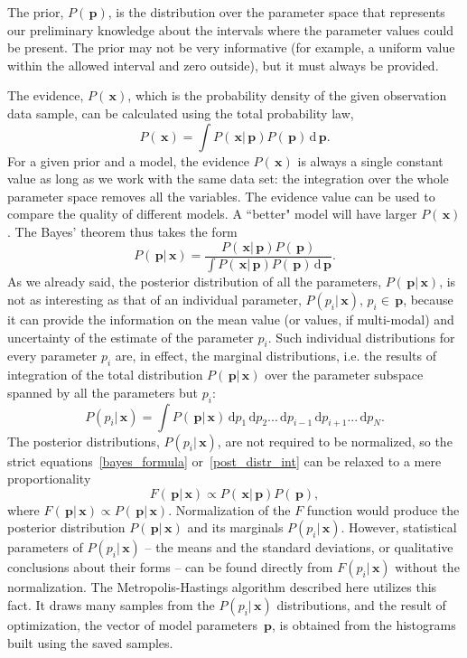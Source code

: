 \documentclass[preprint2]{aastex}
\newcommand{\bfp}{\,\mathbf{p}}
\newcommand{\bfx}{\,\mathbf{x}}
\newcommand{\ud}{\,\mathrm{d}}
\begin{document}
The prior, $P(\bfp)$, is the distribution over the parameter space that represents our preliminary knowledge about the intervals where the parameter values could be present.
The prior may not be very informative (for example, a uniform value within the allowed interval and zero outside), but it must always be provided.  

The evidence, $P(\bfx)$, which is the probability density of the given observation data sample, can be calculated using the total probability law,
\begin{equation}
  P(\bfx) = \int P(\bfx|\bfp)P(\bfp) \ud \bfp.
\end{equation}
For a given prior and a model, the evidence $P(\bfx)$ is always a single constant value as long as we work with the same data set: the integration over the whole parameter space removes all the variables. The evidence value can be used to compare the quality of different models. A ``better" model will have larger $P(\bfx)$. The Bayes' theorem thus takes the form
\begin{equation}
  \label{post_distr_int}
  P(\bfp|\bfx) =  \frac{P(\bfx|\bfp)P(\bfp)}{\int P(\bfx|\bfp)P(\bfp) \ud \bfp}.
\end{equation}
As we already said, the posterior distribution of all the parameters, $P(\bfp|\bfx)$, is not as interesting as that of an individual parameter, $P(p_i|\bfx)$, $p_i \in \bfp$, because it can provide the information on the mean value (or values, if multi-modal) and uncertainty of the estimate of the parameter $p_i$. Such individual distributions for every parameter $p_i$ are, in effect, the marginal distributions, i.e. the results of integration of the total distribution $P(\bfp|\bfx)$ over the parameter subspace spanned by all the parameters but $p_i$:
\begin{equation}
  \label{param_post_distr}
  P(p_i|\bfx) =  \int P(\bfp|\bfx)\ud p_1 \ud p_2 ... \ud p_{i-1} \ud p_{i+1} ... \ud p_N.
\end{equation}
The posterior distributions, $P(p_i|\bfx)$, are not required to be normalized, so the strict equations~\eqref{bayes_formula} or~\eqref{post_distr_int} can be relaxed to a mere proportionality
\begin{equation}
  \label{bayes_propor}
  F(\bfp|\bfx) \propto P(\bfx|\bfp)P(\bfp),
\end{equation}
where $F(\bfp|\bfx) \propto P(\bfp|\bfx)$. Normalization of the $F$ function would produce the posterior distribution $P(\bfp|\bfx)$ and its marginals $P(p_i|\bfx)$. However, statistical parameters of $P(p_i|\bfx)$ -- the means and the standard deviations, or qualitative conclusions about their forms -- can be found directly from $F(p_i|\bfx)$ without the normalization. The Metropolis-Hastings algorithm described here utilizes this fact. It draws many samples from the $P(p_i|\bfx)$ distributions, and the result of optimization, the vector of model parameters $\bfp$, is obtained from the histograms built using the saved samples. 
\end{document}
